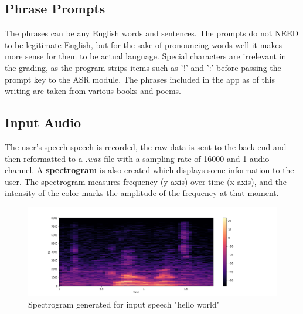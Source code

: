 \documentclass[12pt, letterpaper]{article}
\begin{document}
\subsection*{Phrase Prompts}
The phrases can be any English words and sentences. The prompts do not NEED to be legitimate English, but for the sake of pronouncing words well it makes more sense for them to be actual language. Special characters are irrelevant in the grading, as the program strips items such as '!' and ':' before passing the prompt key to the ASR module. The phrases included in the app as of this writing are taken from various books and poems. 

\subsection*{Input Audio}
The user's speech speech is recorded, the raw data is sent to the back-end and then reformatted to a \textit{.wav} file with a sampling rate of 16000 and 1 audio channel. A \textbf{spectrogram} is also created which displays some information to the user. The spectrogram measures frequency (y-axis) over time (x-axis), and the intensity of the color marks the amplitude of the frequency at that moment.

\begin{figure}[h!]
  \caption{Spectrogram generated for input speech "hello world"}
  \includegraphics[scale=0.5]{images/sample_spectrogram.png}
\end{figure}

\newpage%
\end{document}
